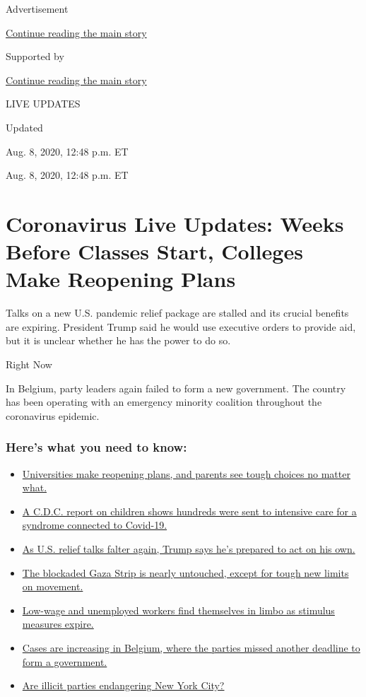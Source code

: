 Advertisement

\protect\hyperlink{after-top}{Continue reading the main story}

Supported by

\protect\hyperlink{after-sponsor}{Continue reading the main story}

LIVE UPDATES

Updated~

Aug. 8, 2020, 12:48 p.m. ET

Aug. 8, 2020, 12:48 p.m. ET

\hypertarget{coronavirus-live-updates-weeks-before-classes-start-colleges-make-reopening-plans}{%
\section{Coronavirus Live Updates: Weeks Before Classes Start, Colleges
Make Reopening
Plans}\label{coronavirus-live-updates-weeks-before-classes-start-colleges-make-reopening-plans}}

Talks on a new U.S. pandemic relief package are stalled and its crucial
benefits are expiring. President Trump said he would use executive
orders to provide aid, but it is unclear whether he has the power to do
so.

Right Now

In Belgium, party leaders again failed to form a new government. The
country has been operating with an emergency minority coalition
throughout the coronavirus epidemic.

\hypertarget{heres-what-you-need-to-know}{%
\subsubsection{Here's what you need to
know:}\label{heres-what-you-need-to-know}}

\begin{itemize}
\tightlist
\item
  \protect\hyperlink{link-7bd2f2ea}{Universities make reopening plans,
  and parents see tough choices no matter what.}
\item
  \protect\hyperlink{link-57c61e05}{A C.D.C. report on children shows
  hundreds were sent to intensive care for a syndrome connected to
  Covid-19.}
\item
  \protect\hyperlink{link-182e4a8e}{As U.S. relief talks falter again,
  Trump says he's prepared to act on his own.}
\item
  \protect\hyperlink{link-bb0ce1a}{The blockaded Gaza Strip is nearly
  untouched, except for tough new limits on movement.}
\item
  \protect\hyperlink{link-1f7e24cf}{Low-wage and unemployed workers find
  themselves in limbo as stimulus measures expire.}
\item
  \protect\hyperlink{link-4b5029e}{Cases are increasing in Belgium,
  where the parties missed another deadline to form a government.}
\item
  \protect\hyperlink{link-17b89333}{Are illicit parties endangering New
  York City?}
\end{itemize}

